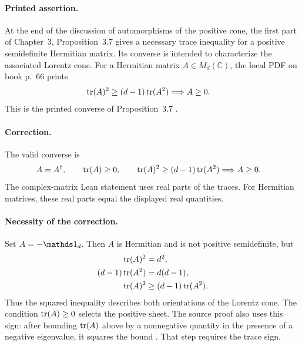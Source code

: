 \documentclass{article}
\begin{document}
\paragraph{Printed assertion.}
At the end of the discussion of automorphisms of the positive cone, the first
part of Chapter~3, Proposition~3.7 gives a necessary trace inequality for a
positive semidefinite Hermitian matrix. Its converse is intended to
characterize the associated Lorentz cone. For a Hermitian matrix
$A\in M_d(\mathbb C)$, the local PDF on book p.~66 prints
\begin{align}
    \operatorname{tr}(A)^2
        &\geq (d-1)\operatorname{tr}(A^2)
        \Longrightarrow A\geq0.
    \label{eq:wolf_lecture_notes_errata_lorentz_printed_converse}
\end{align}
This is the printed converse of Proposition~3.7
\cite[Proposition~3.7]{Wolf2012Quantum}.

\paragraph{Correction.}
The valid converse is
\begin{align}
    A=A^\dagger,\qquad
    \operatorname{tr}(A)\geq0,\qquad
    \operatorname{tr}(A)^2\geq(d-1)\operatorname{tr}(A^2)
        &\Longrightarrow A\geq0.
    \label{eq:wolf_lecture_notes_errata_lorentz_corrected_converse}
\end{align}
The complex-matrix Lean statement uses real parts of the traces. For Hermitian
matrices, these real parts equal the displayed real quantities.

\paragraph{Necessity of the correction.}
Set $A=-\Id_d$. Then $A$ is Hermitian and is not positive semidefinite, but
\begin{align}
    \operatorname{tr}(A)^2
        &=d^2,
    \label{eq:wolf_lecture_notes_errata_lorentz_counterexample_trace}\\
    (d-1)\operatorname{tr}(A^2)
        &=d(d-1),
    \label{eq:wolf_lecture_notes_errata_lorentz_counterexample_square}\\
    \operatorname{tr}(A)^2
        &\geq(d-1)\operatorname{tr}(A^2).
    \label{eq:wolf_lecture_notes_errata_lorentz_counterexample_inequality}
\end{align}
Thus the squared inequality describes both orientations of the Lorentz cone.
The condition $\operatorname{tr}(A)\geq0$ selects the positive sheet. The source proof also
uses this sign: after bounding $\operatorname{tr}(A)$ above by a nonnegative quantity in the
presence of a negative eigenvalue, it squares the bound
\cite[Proposition~3.7]{Wolf2012Quantum}. That step requires the trace sign.
\end{document}
